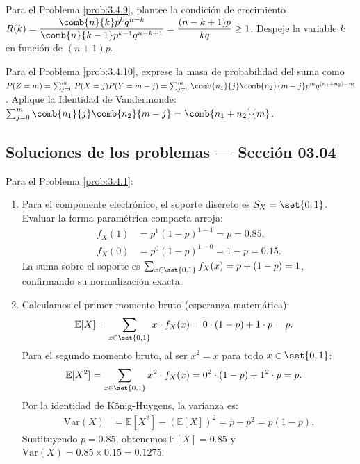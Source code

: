 \begin{sugerencia}
	\label{sug:3.4.9}
	Para el Problema \ref{prob:3.4.9}, plantee la condición de crecimiento $R(k) = \dfrac{\comb{n}{k} p^k q^{n-k}}{\comb{n}{k-1} p^{k-1} q^{n-k+1}} = \dfrac{(n-k+1)p}{kq} \ge 1$. Despeje la variable $k$ en función de $(n+1)p$.
\end{sugerencia}

\begin{sugerencia}
	\label{sug:3.4.10}
	Para el Problema \ref{prob:3.4.10}, exprese la masa de probabilidad del suma como $P(Z = m) = \sum_{j=0}^m P(X = j) P(Y = m-j) = \sum_{j=0}^m \comb{n_1}{j}\comb{n_2}{m-j} p^m q^{(n_1+n_2)-m}$. Aplique la Identidad de Vandermonde: $\sum_{j=0}^m \comb{n_1}{j}\comb{n_2}{m-j} = \comb{n_1+n_2}{m}$.
\end{sugerencia}

\subsection*{Soluciones de los problemas --- Sección 03.04}

\begin{solucion}
	\label{sol:3.4.1}
	Para el Problema \ref{prob:3.4.1}:
	\begin{enumerate}
		\item Para el componente electrónico, el soporte discreto es $\mathcal{S}_X = \set{0, 1}$. Evaluar la forma paramétrica compacta arroja:
		\begin{align*}
			f_X(1) &= p^1 (1-p)^{1-1} = p = 0.85, \\
			f_X(0) &= p^0 (1-p)^{1-0} = 1-p = 0.15.
		\end{align*}
		La suma sobre el soporte es $\sum_{x \in \set{0,1}} f_X(x) = p + (1-p) = 1$, confirmando su normalización exacta.
		\item Calculamos el primer momento bruto (esperanza matemática):
		\begin{align*}
			\mathbb{E}[X] &= \sum_{x \in \set{0,1}} x \cdot f_X(x) = 0 \cdot (1-p) + 1 \cdot p = p.
		\end{align*}
		Para el segundo momento bruto, al ser $x^2 = x$ para todo $x \in \set{0, 1}$:
		\begin{align*}
			\mathbb{E}[X^2] &= \sum_{x \in \set{0,1}} x^2 \cdot f_X(x) = 0^2 \cdot (1-p) + 1^2 \cdot p = p.
		\end{align*}
		Por la identidad de König-Huygens, la varianza es:
		\begin{align*}
			\text{Var}(X) &= \mathbb{E}[X^2] - (\mathbb{E}[X])^2 = p - p^2 = p(1-p).
		\end{align*}
		Sustituyendo $p = 0.85$, obtenemos $\mathbb{E}[X] = 0.85$ y $\text{Var}(X) = 0.85 \times 0.15 = 0.1275$.
	\end{enumerate}
\end{solucion}

